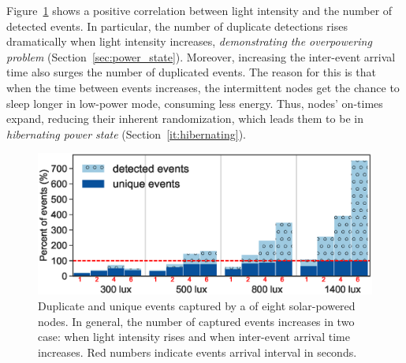 Figure~\ref{fig:events_detection_rate} shows a positive correlation between light intensity and the number of detected events. In particular, the number of duplicate detections rises dramatically when light intensity increases, \emph{demonstrating the overpowering problem} (Section~\ref{sec:power_state}). Moreover, increasing the inter-event arrival time also surges the number of duplicated events. The reason for this is that when the time between events increases, the intermittent nodes get the chance to sleep longer in low-power mode, consuming less energy. Thus, nodes' on-times expand, reducing their inherent randomization, which leads them to be in \textit{hibernating power state} (Section~\ref{it:hibernating}).  


\begin{figure}[t!]
		\centering
	    \includegraphics[width=\columnwidth]{figures/regular_events_capture_rate_2}
		\caption{Duplicate and unique events captured by a \fullcim of eight solar-powered nodes. In general, the number of captured events increases in two case: when light intensity rises and when inter-event arrival time increases. 
         Red numbers indicate events arrival interval in seconds.
         }
    	\label{fig:events_detection_rate}
\end{figure} 

